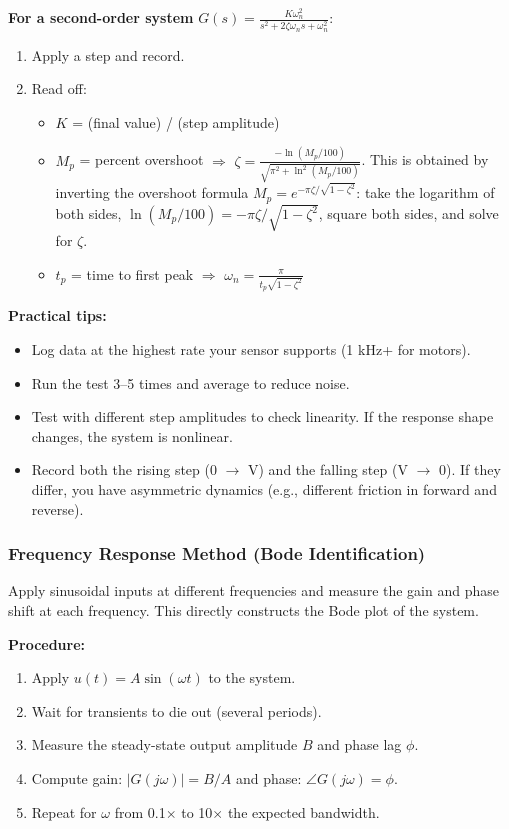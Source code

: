 \textbf{For a second-order system} $G(s) = \frac{K\omega_n^2}{s^2 + 2\zeta\omega_n s + \omega_n^2}$:
\begin{enumerate}
    \item Apply a step and record.
    \item Read off:
    \begin{itemize}[nosep]
        \item $K$ = (final value) / (step amplitude)
        \item $M_p$ = percent overshoot $\Rightarrow$ $\zeta = \frac{-\ln(M_p/100)}{\sqrt{\pi^2 + \ln^2(M_p/100)}}$.
        This is obtained by inverting the overshoot formula $M_p = e^{-\pi\zeta/\sqrt{1-\zeta^2}}$: take the logarithm of both sides, $\ln(M_p/100) = -\pi\zeta/\sqrt{1-\zeta^2}$, square both sides, and solve for $\zeta$.
        \item $t_p$ = time to first peak $\Rightarrow$ $\omega_n = \frac{\pi}{t_p \sqrt{1 - \zeta^2}}$
    \end{itemize}
\end{enumerate}

\textbf{Practical tips:}
\begin{itemize}
    \item Log data at the highest rate your sensor supports (1 kHz+ for motors).
    \item Run the test 3--5 times and average to reduce noise.
    \item Test with different step amplitudes to check linearity. If the response shape changes, the system is nonlinear.
    \item Record both the rising step (0 $\to$ V) and the falling step (V $\to$ 0). If they differ, you have asymmetric dynamics (e.g., different friction in forward and reverse).
\end{itemize}

\subsubsection{Frequency Response Method (Bode Identification)}

Apply sinusoidal inputs at different frequencies and measure the gain and phase shift at each frequency. This directly constructs the Bode plot of the system.

\textbf{Procedure:}
\begin{enumerate}
    \item Apply $u(t) = A \sin(\omega t)$ to the system.
    \item Wait for transients to die out (several periods).
    \item Measure the steady-state output amplitude $B$ and phase lag $\phi$.
    \item Compute gain: $|G(j\omega)| = B/A$ and phase: $\angle G(j\omega) = \phi$.
    \item Repeat for $\omega$ from 0.1$\times$ to 10$\times$ the expected bandwidth.
\end{enumerate}

